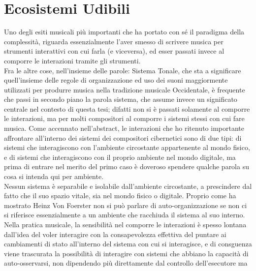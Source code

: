 \section{Ecosistemi Udibili}
\label{sec:Ecosistemi Udibili}

Uno degli esiti musicali più importanti che ha portato con sé 
il paradigma della complessità, riguarda essenzialmente l'aver smesso di 
scrivere musica per strumenti interattivi con cui farla (e viceversa), 
ed esser passati invece al  comporre le interazioni tramite gli strumenti. \\
Fra le altre cose, nell'insieme delle parole: Sistema Tonale, 
che sta a significare quell'insieme delle regole di organizzazione ed uso dei
suoni maggiormente utilizzati per produrre musica nella tradizione 
musicale Occidentale, è frequente che passi in secondo piano la parola 
sistema, che assume invece un significato centrale nel contesto di questa tesi;
difatti non si è passati solamente al comporre le interazioni, 
ma per molti compositori al comporre i sistemi stessi con cui fare musica.
Come accennato nell'abstract, le interazioni che ho ritenuto importante affrontare 
all'interno dei sistemi dei compositori cibernetici sono di due tipi:
di sistemi che interagiscono con l’ambiente circostante appartenente al mondo fisico, 
e di sistemi che interagiscono con il proprio ambiente nel mondo digitale, 
ma prima di entrare nel merito del primo caso
è doveroso spendere qualche parola su cosa
si intenda qui per ambiente. \\
Nessun sistema è separabile e isolabile dall'ambiente circostante, 
a prescindere dal fatto che il suo spazio vitale, sia nel mondo fisico o digitale. 
Proprio come ha mostrato Heinz Von Foerster non si può parlare di auto-organizzazione
se non ci si riferisce essenzialmente a un ambiente che racchiuda il sistema al suo interno.
Nella pratica musicale, la sensibilità nel comporre le interazioni
è spesso lontana dall'idea del voler interagire con la consapevolezza effettiva del 
puntare ai cambiamenti di stato all'interno del sistema con cui si interagisce,
e di consguenza viene trascurata la possibilità di interagire con sistemi che abbiano
la capacità di auto-osservarsi, non dipendendo più direttamente dal controllo dell'esecutore ma 
